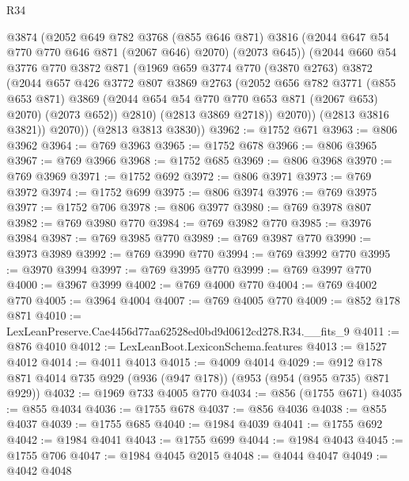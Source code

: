 \begin{lexlean}{R34}
\begin{coremodule}
              @3874
              (@2052
                @649
                @782
                @3768
                (@855 @646 @871)
                @3816
                (@2044 @647 @54 @770 @770 @646 @871 (@2067 @646) @2070)
                (@2073 @645))
              (@2044
                @660
                @54
                @3776
                @770
                @3872
                @871
                (@1969
                  @659
                  @3774
                  @770
                  (@3870 @2763)
                  @3872
                  (@2044
                    @657
                    @426
                    @3772
                    @807
                    @3869
                    @2763
                    (@2052
                      @656
                      @782
                      @3771
                      (@855 @653 @871)
                      @3869
                      (@2044 @654 @54 @770 @770 @653 @871 (@2067 @653) @2070)
                      (@2073 @652))
                    @2810)
                  (@2813 @3869 @2718))
                @2070))
            (@2813 @3816 @3821))
          @2070))
      (@2813 @3813 @3830))
@3962 := @1752 @671
@3963 := @806 @3962
@3964 := @769 @3963
@3965 := @1752 @678
@3966 := @806 @3965
@3967 := @769 @3966
@3968 := @1752 @685
@3969 := @806 @3968
@3970 := @769 @3969
@3971 := @1752 @692
@3972 := @806 @3971
@3973 := @769 @3972
@3974 := @1752 @699
@3975 := @806 @3974
@3976 := @769 @3975
@3977 := @1752 @706
@3978 := @806 @3977
@3980 := @769 @3978 @807
@3982 := @769 @3980 @770
@3984 := @769 @3982 @770
@3985 := @3976 @3984
@3987 := @769 @3985 @770
@3989 := @769 @3987 @770
@3990 := @3973 @3989
@3992 := @769 @3990 @770
@3994 := @769 @3992 @770
@3995 := @3970 @3994
@3997 := @769 @3995 @770
@3999 := @769 @3997 @770
@4000 := @3967 @3999
@4002 := @769 @4000 @770
@4004 := @769 @4002 @770
@4005 := @3964 @4004
@4007 := @769 @4005 @770
@4009 := @852 @178 @871
@4010 := LexLeanPreserve.Cae4456d77aa62528ed0bd9d0612cd278.R34.__fits_9
@4011 := @876 @4010
@4012 := LexLeanBoot.LexiconSchema.features
@4013 := @1527 @4012
@4014 := @4011 @4013
@4015 := @4009 @4014
@4029 := @912 @178 @871 @4014 @735 @929 (@936 (@947 @178)) (@953 (@954 (@955 @735) @871 @929))
@4032 := @1969 @733 @4005 @770
@4034 := @856 (@1755 @671)
@4035 := @855 @4034
@4036 := @1755 @678
@4037 := @856 @4036
@4038 := @855 @4037
@4039 := @1755 @685
@4040 := @1984 @4039
@4041 := @1755 @692
@4042 := @1984 @4041
@4043 := @1755 @699
@4044 := @1984 @4043
@4045 := @1755 @706
@4047 := @1984 @4045 @2015
@4048 := @4044 @4047
@4049 := @4042 @4048

\end{coremodule}
\end{lexlean}
